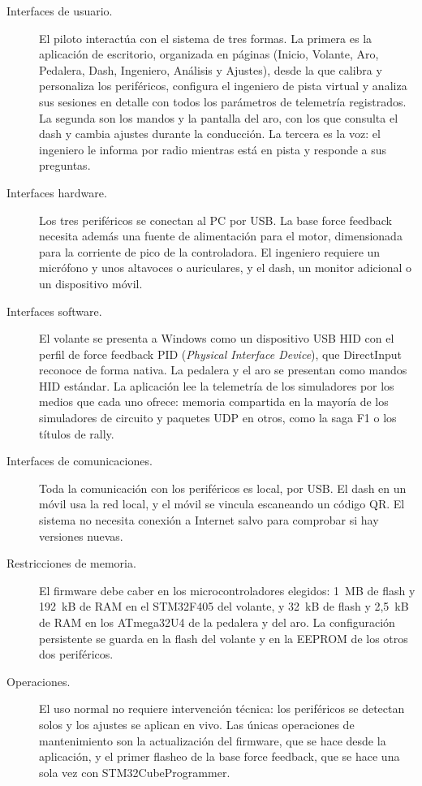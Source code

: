  \begin{description}
 	\item[Interfaces de usuario.] El piloto interactúa con el sistema de tres formas. La primera es la aplicación de escritorio, organizada en páginas (Inicio, Volante, Aro, Pedalera, Dash, Ingeniero, Análisis y Ajustes), desde la que calibra y personaliza los periféricos, configura el ingeniero de pista virtual y analiza sus sesiones en detalle con todos los parámetros de telemetría registrados. La segunda son los mandos y la pantalla del aro, con los que consulta el dash y cambia ajustes durante la conducción. La tercera es la voz: el ingeniero le informa por radio mientras está en pista y responde a sus preguntas.
 	\item[Interfaces hardware.] Los tres periféricos se conectan al PC por USB. La base force feedback necesita además una fuente de alimentación para el motor, dimensionada para la corriente de pico de la controladora. El ingeniero requiere un micrófono y unos altavoces o auriculares, y el dash, un monitor adicional o un dispositivo móvil.
 	\item[Interfaces software.] El volante se presenta a Windows como un dispositivo USB HID con el perfil de force feedback PID (\emph{Physical Interface Device}), que DirectInput reconoce de forma nativa. La pedalera y el aro se presentan como mandos HID estándar. La aplicación lee la telemetría de los simuladores por los medios que cada uno ofrece: memoria compartida en la mayoría de los simuladores de circuito y paquetes UDP en otros, como la saga F1 o los títulos de rally.
 	\item[Interfaces de comunicaciones.] Toda la comunicación con los periféricos es local, por USB. El dash en un móvil usa la red local, y el móvil se vincula escaneando un código QR. El sistema no necesita conexión a Internet salvo para comprobar si hay versiones nuevas.
 	\item[Restricciones de memoria.] El firmware debe caber en los microcontroladores elegidos: 1~MB de flash y 192~kB de RAM en el STM32F405 del volante, y 32~kB de flash y 2,5~kB de RAM en los ATmega32U4 de la pedalera y del aro. La configuración persistente se guarda en la flash del volante y en la EEPROM de los otros dos periféricos.
 	\item[Operaciones.] El uso normal no requiere intervención técnica: los periféricos se detectan solos y los ajustes se aplican en vivo. Las únicas operaciones de mantenimiento son la actualización del firmware, que se hace desde la aplicación, y el primer flasheo de la base force feedback, que se hace una sola vez con STM32CubeProgrammer.
 \end{description}
 
